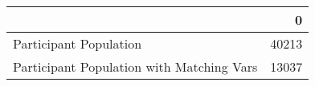 \begin{tabular}{lr}
\toprule
{} &      0 \\
\midrule
Participant Population                    &  40213 \\
Participant Population with Matching Vars &  13037 \\
\bottomrule
\end{tabular}
